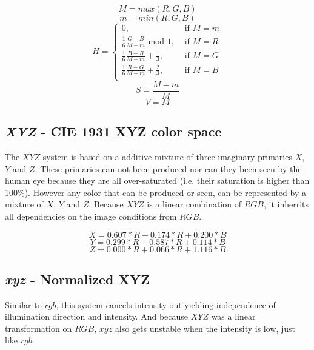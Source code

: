 \documentclass[11pt]{article}
\begin{document}
\begin{equation}
  M = max(R,G,B)
  \label{eq:M}
\end{equation}
\begin{equation}
  m = min(R,G,B)
  \label{eq:m}
\end{equation}
\begin{equation}
  H =
    \left\{\begin{array}{ll}
      0, & \textrm{~if~} M = m \\
      \frac{1}{6}\frac{G-B}{M-m} \textrm{~mod~} 1,& \textrm{~if~} M = R \\
      \frac{1}{6}\frac{B-R}{M-m} + \frac{1}{3},& \textrm{~if~} M = G \\
      \frac{1}{6}\frac{R-G}{M-m} + \frac{2}{3},& \textrm{~if~} M = B \\      
    \end{array}\right.
  \label{eq:H}
\end{equation}
\begin{equation}
  S = \frac{M-m}{M}
  \label{eq:S}
\end{equation}
\begin{equation}
  V = M
  \label{eq:V}
\end{equation}

\subsection{\textit{XYZ} - CIE 1931 XYZ color space}
The $XYZ$ system is based on a additive mixture of three imaginary primaries
$X$, $Y$ and $Z$. These primaries can not been produced nor can they been seen by the human
eye because they are all over-saturated (i.e. their saturation is higher than
100\%). However any color that can be produced or seen, can be represented by a
mixture of $X$, $Y$ and $Z$. Because $XYZ$ is a linear combination of $RGB$, it
inherrits all dependencies on the image conditions from $RGB$.

\begin{equation}
  X = 0.607 * R + 0.174 * R + 0.200 * B
  \label{eq:X}
\end{equation}
\begin{equation}
  Y = 0.299 * R + 0.587 * R + 0.114 * B
  \label{eq:Y}
\end{equation}
\begin{equation}
  Z = 0.000 * R + 0.066 * R + 1.116 * B
  \label{eq:Z}
\end{equation}

\subsection{\textit{xyz} - Normalized XYZ}
Similar to $rgb$, this system cancels intensity out yielding independence of
illumination direction and intensity. And because $XYZ$ was a linear
transformation on $RGB$, $xyz$ also gets unstable when the intensity is low,
just like $rgb$.
\end{document}
